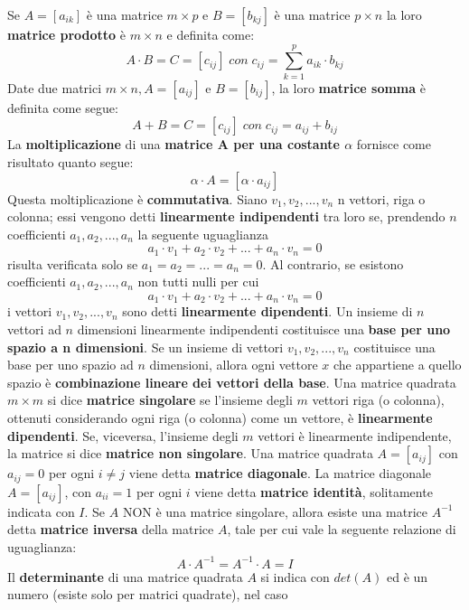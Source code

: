 \documentclass[12pt]{article}
\begin{document}
Se $A = [a_{ik}]$ è una matrice $m \times p$ e $B = [b_{kj}]$ è una matrice $p \times n$ la loro
\textbf{matrice prodotto} è $m \times n$ e definita come:
$$A \cdot B = C = [c_{ij}] \; con \; c_{ij} = \sum_{k = 1}^{p} a_{ik} \cdot b_{kj}$$
Date due matrici $m \times n, A = [a_{ij}]$ e $B = [b_{ij}]$, la loro \textbf{matrice somma} è definita come segue:
$$A+B=C=[c_{ij}] \; con \; c_{ij} = a_{ij} + b_{ij}$$
La \textbf{moltiplicazione} di una \textbf{matrice A per una costante $\alpha$} fornisce come risultato quanto segue:
$$\alpha \cdot A = [\alpha \cdot a_{ij}]$$
Questa moltiplicazione è \textbf{commutativa}. \newline
Siano $v_1, v_2, ..., v_n$ n vettori, riga o colonna; essi vengono detti
\textbf{linearmente indipendenti} tra loro se, prendendo $n$ coefficienti $a_1, a_2, ..., a_n$ la seguente uguaglianza
$$a_1 \cdot v_1 + a_2 \cdot v_2 + ... + a_n \cdot v_n = 0$$
risulta verificata solo se $a_1 = a_2 = ... = a_n = 0$. \newline
Al contrario, se esistono coefficienti $a_1, a_2, ..., a_n$ non tutti nulli per cui
$$a_1 \cdot v_1 + a_2 \cdot v_2 + ... + a_n \cdot v_n = 0$$
i vettori $v_1, v_2, ..., v_n$ sono detti \textbf{linearmente dipendenti}. \newline
Un insieme di $n$ vettori ad $n$ dimensioni linearmente indipendenti costituisce una \textbf{base per uno spazio a n dimensioni}.
Se un insieme di vettori $v_1, v_2, ..., v_n$ costituisce una base per uno spazio ad $n$ dimensioni, allora ogni vettore $x$ che appartiene
a quello spazio è \textbf{combinazione lineare dei vettori della base}. \newline
Una matrice quadrata $m \times m$ si dice \textbf{matrice singolare} se l'insieme degli $m$ vettori riga (o colonna), ottenuti considerando
ogni riga (o colonna) come un vettore, è \textbf{linearmente dipendenti}.
Se, viceversa, l'insieme degli $m$ vettori è linearmente indipendente, la matrice si dice \textbf{matrice non singolare}. \newline
Una matrice quadrata $A = [a_{ij}]$ con $a_{ij} = 0$ per ogni $i \neq j$ viene detta \textbf{matrice diagonale}. \newline
La matrice diagonale $A = [a_{ij}]$, con $a_{ii} = 1$ per ogni $i$ viene detta \textbf{matrice identità}, solitamente indicata con $I$.
Se $A$ NON è una matrice singolare, allora esiste una matrice $A^{-1}$ detta \textbf{matrice inversa} della matrice $A$, tale per cui vale la
seguente relazione di uguaglianza:
$$A \cdot A^{-1} = A^{-1} \cdot A = I$$
Il \textbf{determinante} di una matrice quadrata $A$ si indica con $det(A)$ ed è un numero (esiste solo per matrici quadrate), nel caso
\end{document}
